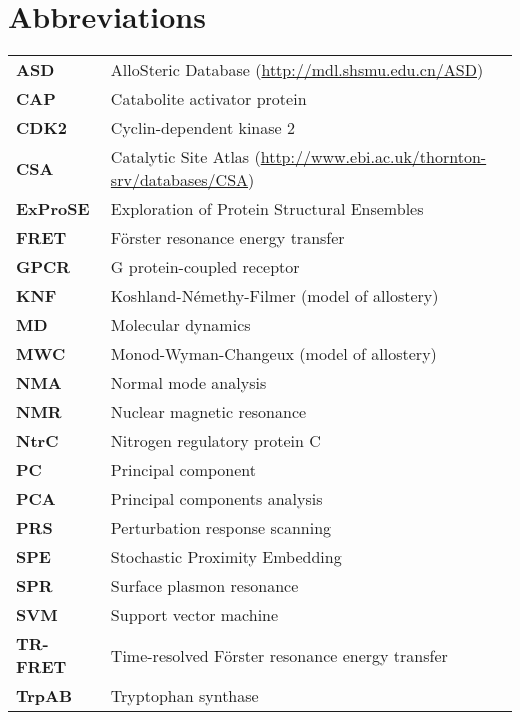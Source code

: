 \chapter*{Abbreviations}

\begin{tabular}{ >{\bfseries}l l }
ASD      &  AlloSteric Database (\url{http://mdl.shsmu.edu.cn/ASD}) \\
CAP      &  Catabolite activator protein \\
CDK2     &  Cyclin-dependent kinase 2 \\
CSA      &  Catalytic Site Atlas (\url{http://www.ebi.ac.uk/thornton-srv/databases/CSA}) \\
ExProSE  &  Exploration of Protein Structural Ensembles \\
FRET     &  F\"{o}rster resonance energy transfer \\
GPCR     &  G protein-coupled receptor \\
KNF      &  Koshland-N\'{e}methy-Filmer (model of allostery) \\
MD       &  Molecular dynamics \\
MWC      &  Monod-Wyman-Changeux (model of allostery) \\
NMA      &  Normal mode analysis \\
NMR      &  Nuclear magnetic resonance \\
NtrC     &  Nitrogen regulatory protein C \\
PC       &  Principal component \\
PCA      &  Principal components analysis \\
PRS      &  Perturbation response scanning \\
SPE      &  Stochastic Proximity Embedding \\
SPR      &  Surface plasmon resonance \\
SVM      &  Support vector machine \\
TR-FRET  &  Time-resolved F\"{o}rster resonance energy transfer \\
TrpAB    &  Tryptophan synthase \\
\end{tabular}
